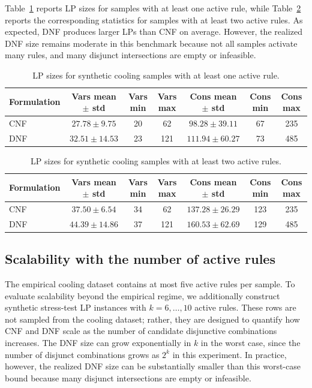 \documentclass{article}
\theoremstyle{plain}
\theoremstyle{definition}
\theoremstyle{remark}
\begin{document}
Table~\ref{tab:lp-size-active1} reports LP sizes for samples with at least one active rule, while Table~\ref{tab:lp-size-active2} reports the corresponding statistics for samples with at least two active rules. As expected, DNF produces larger LPs than CNF on average. However, the realized DNF size remains moderate in this benchmark because not all samples activate many rules, and many disjunct intersections are empty or infeasible.

\begin{table}[h]
\centering
\caption{LP sizes for synthetic cooling samples with at least one active rule.}
\label{tab:lp-size-active1}
\begin{tabular}{lcccccc}
\toprule
Formulation & Vars mean $\pm$ std & Vars min & Vars max &
Cons mean $\pm$ std & Cons min & Cons max \\
\midrule
CNF & $27.78 \pm 9.75$ & 20 & 62 & $98.28 \pm 39.11$ & 67 & 235 \\
DNF & $32.51 \pm 14.53$ & 23 & 121 & $111.94 \pm 60.27$ & 73 & 485 \\
\bottomrule
\end{tabular}
\end{table}

\begin{table}[h]
\centering
\caption{LP sizes for synthetic cooling samples with at least two active rules.}
\label{tab:lp-size-active2}
\begin{tabular}{lcccccc}
\toprule
Formulation & Vars mean $\pm$ std & Vars min & Vars max &
Cons mean $\pm$ std & Cons min & Cons max \\
\midrule
CNF & $37.50 \pm 6.54$ & 34 & 62 & $137.28 \pm 26.29$ & 123 & 235 \\
DNF & $44.39 \pm 14.86$ & 37 & 121 & $160.53 \pm 62.69$ & 129 & 485 \\
\bottomrule
\end{tabular}
\end{table}

\subsection{Scalability with the number of active rules}
\label{app:scalability}

The empirical cooling dataset contains at most five active rules per sample. To evaluate scalability beyond the empirical regime, we additionally construct synthetic stress-test LP instances with $k=6,\ldots,10$ active rules. These rows are not sampled from the cooling dataset; rather, they are designed to quantify how CNF and DNF scale as the number of candidate disjunctive combinations increases. The DNF size can grow exponentially in $k$ in the worst case, since the number of disjunct combinations grows as $2^k$ in this experiment. In practice, however, the realized DNF size can be substantially smaller than this worst-case bound because many disjunct intersections are empty or infeasible.
\end{document}

